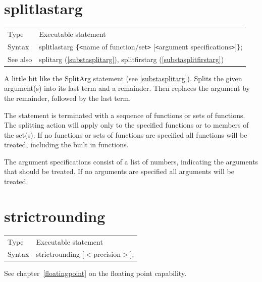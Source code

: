 
\section{splitlastarg}
\label{substasplitlastarg}

\noindent \begin{tabular}{ll}
Type & Executable statement\\
Syntax & splitlastarg \verb:{:{\tt<}name of function/set{\tt>}
         [{\tt<}argument specifications{\tt>}]\verb:}:;
\\ See also & splitarg (\ref{substasplitarg}),
             splitfirstarg (\ref{substasplitfirstarg})
\end{tabular}\vspace{4mm}

\noindent A little bit like the 
SplitArg statement (see \ref{substasplitarg}). Splits the 
given argument(s) into its last term and a remainder. Then replaces the 
argument by the remainder, followed by the last term.

\noindent The statement is terminated with a sequence of functions or sets 
of functions. The splitting action will apply only to the specified 
functions or to members of the set(s). If no functions or sets 
of functions are specified all functions will be treated, including the 
built in functions.
 
\noindent The argument specifications consist of a list of numbers, 
indicating the arguments that should be treated. If no arguments are 
specified all arguments will be treated. \vspace{10mm}

\section{strictrounding}
\label{substastrictrounding}

\noindent \begin{tabular}{ll}
Type & Executable statement\\
Syntax & strictrounding [$<$precision$>$]; \\ 
\end{tabular} \vspace{4mm}

\noindent See chapter~\ref{floatingpoint} on the floating point capability.
 

